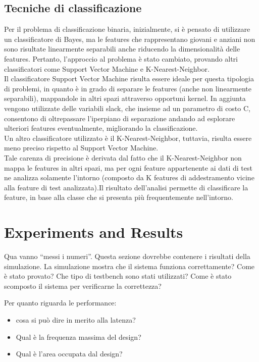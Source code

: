 \documentclass[12pt]{IEEEtran}
\begin{document}
\subsection{Tecniche di classificazione}
Per il problema di classificazione binaria, inizialmente, si è pensato di utilizzare un classificatore di Bayes, ma le features che rappresentano giovani e anziani non sono risultate linearmente separabili anche riducendo la dimensionalità delle features. Pertanto, l'approccio al problema è stato cambiato, provando altri classificatori come Support Vector Machine e K-Nearest-Neighbor. \\
Il classificatore Support Vector Machine risulta essere ideale per questa tipologia di problemi, in quanto è in grado di separare le features (anche non linearmente separabili), mappandole in altri spazi attraverso opportuni kernel. In aggiunta vengono utilizzate  delle variabili slack, che insieme ad un parametro di costo C, consentono di oltrepassare l'iperpiano di separazione andando ad esplorare ulteriori features eventualmente, migliorando la classificazione. \\
Un altro classificatore utilizzato è il K-Nearest-Neighbor, tuttavia, risulta essere meno preciso rispetto al Support Vector Machine. \\
Tale carenza di precisione è derivata dal fatto che il K-Nearest-Neighbor non mappa le features in altri spazi, ma per ogni feature appartenente ai dati di test ne analizza solamente l'intorno (composto da K features di addestramento vicine alla feature di test analizzata).Il risultato dell'analisi permette di classificare la feature, in base alla classe che si presenta più frequentemente nell'intorno. 


\section{Experiments and Results}

Qua vanno ``messi i numeri''. Questa sezione dovrebbe contenere i risultati della simulazione. La simulazione mostra che il sistema funziona correttamente? Come \`e stato provato? Che tipo di testbench sono stati utilizzati? Come \`e stato scomposto il sistema per verificarne la correttezza?

Per quanto riguarda le performance:
\begin{itemize}
\item cosa si pu\`o dire in merito alla latenza?
\item Qual è la frequenza massima del design? 
\item Qual è l'area occupata dal design? 
\end{itemize}
\end{document}
